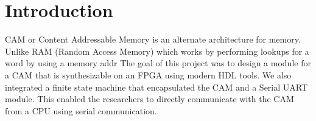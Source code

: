 \section{Introduction}
CAM or Content Addressable Memory is an alternate architecture for memory. Unlike RAM (Random Access Memory) which works by performing lookups for a word by using a memory addr
The goal of this project was to design a module for a CAM that is synthesizable on an FPGA using modern HDL tools. 
We also integrated a finite state machine that encapsulated the CAM and a Serial UART module. 
This enabled the researchers to directly communicate with the CAM from a CPU using serial communication. 
